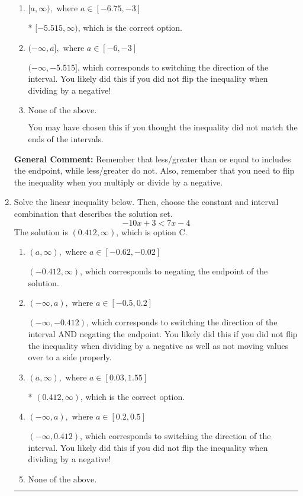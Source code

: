 \documentclass{extbook}[14pt]
\newcommand{\litem}[1]{\item #1

\rule{\textwidth}{0.4pt}}
\begin{document}
\begin{enumerate}
{\begin{enumerate}[label=\Alph*.]
 $(-\infty, 5.515]$, which corresponds to switching the direction of the interval AND negating the endpoint. You likely did this if you did not flip the inequality when dividing by a negative as well as not moving values over to a side properly.
\item \( [a, \infty), \text{ where } a \in [-6.75, -3] \)

* $[-5.515, \infty)$, which is the correct option.
\item \( (-\infty, a], \text{ where } a \in [-6, -3] \)

 $(-\infty, -5.515]$, which corresponds to switching the direction of the interval. You likely did this if you did not flip the inequality when dividing by a negative!
\item \( \text{None of the above}. \)

You may have chosen this if you thought the inequality did not match the ends of the intervals.
\end{enumerate}

\textbf{General Comment:} Remember that less/greater than or equal to includes the endpoint, while less/greater do not. Also, remember that you need to flip the inequality when you multiply or divide by a negative.
}
\litem{
Solve the linear inequality below. Then, choose the constant and interval combination that describes the solution set.
\[ -10x + 3 < 7x -4 \]The solution is \( (0.412, \infty) \), which is option C.\begin{enumerate}[label=\Alph*.]
\item \( (a, \infty), \text{ where } a \in [-0.62, -0.02] \)

 $(-0.412, \infty)$, which corresponds to negating the endpoint of the solution.
\item \( (-\infty, a), \text{ where } a \in [-0.5, 0.2] \)

 $(-\infty, -0.412)$, which corresponds to switching the direction of the interval AND negating the endpoint. You likely did this if you did not flip the inequality when dividing by a negative as well as not moving values over to a side properly.
\item \( (a, \infty), \text{ where } a \in [0.03, 1.55] \)

* $(0.412, \infty)$, which is the correct option.
\item \( (-\infty, a), \text{ where } a \in [0.2, 0.5] \)

 $(-\infty, 0.412)$, which corresponds to switching the direction of the interval. You likely did this if you did not flip the inequality when dividing by a negative!
\item \( \text{None of the above}. \)


\end{enumerate}}
\end{enumerate}
\end{document}
